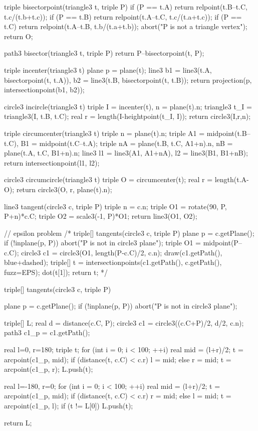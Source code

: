 triple bisectorpoint(triangle3 t, triple P) {
	if (P == t.A) {
    	return relpoint(t.B--t.C, t.c/(t.b+t.c));
    }
  	if (P == t.B) {
    	return relpoint(t.A--t.C, t.c/(t.a+t.c));
    }
  	if (P == t.C) {
    	return relpoint(t.A--t.B, t.b/(t.a+t.b));
    }
  	abort("P is not a triangle vertex");
  	return O;
}

path3 bisector(triangle3 t, triple P) {
	return P--bisectorpoint(t, P);
}

triple incenter(triangle3 t) {
  	plane p = plane(t);
	line3 b1 = line3(t.A, bisectorpoint(t, t.A)),
      	  b2 = line3(t.B, bisectorpoint(t, t.B));
  	return projection(p, intersectionpoint(b1, b2));
}

circle3 incircle(triangle3 t) {
	triple I = incenter(t), n = plane(t).n;
  	triangle3 t_I = triangle3(I, t.B, t.C);
  	real r = length(I-heightpoint(t_I, I));
  	return circle3(I,r,n);
}

triple circumcenter(triangle3 t) {
  	triple n = plane(t).n;
	triple A1 = midpoint(t.B--t.C), 
  		   B1 = midpoint(t.C--t.A);
  	triple nA = plane(t.B, t.C, A1+n).n,
  		   nB = plane(t.A, t.C, B1+n).n;
  	line3 l1 = line3(A1, A1+nA),
  		  l2 = line3(B1, B1+nB);
  	return intersectionpoint(l1, l2);
}

circle3 circumcircle(triangle3 t) {
	triple O = circumcenter(t);
  	real r = length(t.A-O);
  	return circle3(O, r, plane(t).n);
}

line3 tangent(circle3 c, triple P) {
	triple n = c.n;
  	triple O1 = rotate(90, P, P+n)*c.C;
  	triple O2 = scale3(-1, P)*O1;
  	return line3(O1, O2);
}


// epsilon problem
/* triple[] tangents(circle3 c, triple P) {
  	plane p = c.getPlane();
  	if (!inplane(p, P)) abort("P is not in circle3 plane");
  	triple O1 = midpoint(P--c.C);
  	circle3 c1 = circle3(O1, length(P-c.C)/2, c.n);
  	draw(c1.getPath(), blue+dashed);
  	triple[] t = intersectionpoints(c1.getPath(), c.getPath(), fuzz=EPS);
  	dot(t[1]);
  	return t;
} */

triple[] tangents(circle3 c, triple P) {
    plane p = c.getPlane();
    if (!inplane(p, P)) abort("P is not in circle3 plane");
  
  	triple[] L;
  	real d = distance(c.C, P);
  	circle3 c1 = circle3((c.C+P)/2, d/2, c.n);
  	path3 c1_p = c1.getPath();
  
  	real l=0, r=180;
  	triple t;
  	for (int i = 0; i < 100; ++i) {
    	real mid = (l+r)/2;
      	t = arcpoint(c1_p, mid);
      	if (distance(t, c.C) < c.r) l = mid;
      	else r = mid;
    }
	t = arcpoint(c1_p, r);
  	L.push(t);
  	
  	real l=-180, r=0;
  	for (int i = 0; i < 100; ++i) {
    	real mid = (l+r)/2;
      	t = arcpoint(c1_p, mid);
      	if (distance(t, c.C) < c.r) r = mid;
      	else l = mid;
    }
	t = arcpoint(c1_p, l);
  	if (t != L[0]) L.push(t);
  
	return L;
} 


